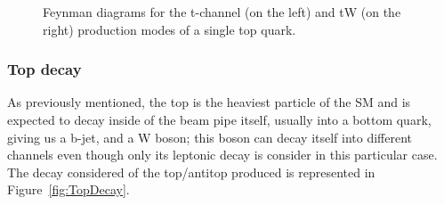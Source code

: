 \documentclass[a4paper, 10pt, openright]{report}
\begin{document}
\begin{figure}[htbp]
\centering
\begin{minipage}[b]{.34\textwidth}
\end{minipage} 
\begin{minipage}[b]{.34\textwidth}
\end{minipage} 
\caption{Feynman diagrams for the t-channel (on the left) and tW (on the right) production modes of a single top quark.}
\label{fig:singleTopOtherChann}
\end{figure}

\subsubsection{Top decay} \label{subsection:topDecay}

As previously mentioned, the top is the heaviest particle of the \ac{SM} and is expected to decay inside of the beam pipe itself, usually into a bottom quark, giving us a b-jet, and a W boson; this boson can decay itself into different channels even though only its leptonic decay is consider in this particular case. The decay considered of the top/antitop produced is represented in Figure~\ref{fig:TopDecay}.
\end{document}
